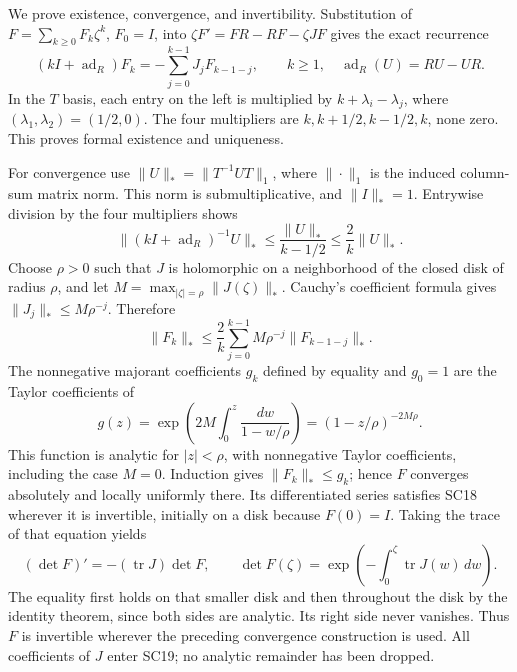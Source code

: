 \documentclass[11pt,a4paper]{article}
\theoremstyle{definition}\newtheorem{definition}[theorem]{Definition}
\begin{document}
We prove existence, convergence, and invertibility. Substitution
of \(F=\sum_{k\ge0}F_k\zeta^k\), \(F_0=I\), into
\(\zeta F'=FR-RF-\zeta JF\) gives the exact recurrence
\[
 (kI+\operatorname{ad}_R)F_k
   =-\sum_{j=0}^{k-1}J_jF_{k-1-j},\qquad k\ge1,
 \quad \operatorname{ad}_R(U)=RU-UR .
 \tag{SC19}
\]
In the \(T\) basis, each entry on the left is multiplied by
\(k+\lambda_i-\lambda_j\), where
\((\lambda_1,\lambda_2)=(1/2,0)\). The four multipliers are
\(k,k+1/2,k-1/2,k\), none zero. This proves formal existence
and uniqueness.

For convergence use
\(\|U\|_*=\|T^{-1}UT\|_1\), where \(\|\cdot\|_1\) is the
induced column-sum matrix norm. This norm is submultiplicative,
and \(\|I\|_*=1\). Entrywise division by the four multipliers
shows
\[
 \|(kI+\operatorname{ad}_R)^{-1}U\|_*
 \le\frac{\|U\|_*}{k-1/2}\le\frac2k\|U\|_*.
 \tag{SC20}
\]
Choose \(\rho>0\) such that \(J\) is holomorphic on a neighborhood
of the closed disk of radius \(\rho\), and let
\(M=\max_{|\zeta|=\rho}\|J(\zeta)\|_*\).
Cauchy's coefficient formula gives
\(\|J_j\|_*\le M\rho^{-j}\). Therefore
\[
 \|F_k\|_*\le\frac2k\sum_{j=0}^{k-1}
 M\rho^{-j}\|F_{k-1-j}\|_*.
\]
The nonnegative majorant coefficients \(g_k\) defined by equality
and \(g_0=1\) are the Taylor coefficients of
\[
 g(z)=\exp\!\left(2M\int_0^z\frac{dw}{1-w/\rho}\right)
     =(1-z/\rho)^{-2M\rho}.
 \tag{SC21}
\]
This function is analytic for \(|z|<\rho\), with nonnegative
Taylor coefficients, including the case \(M=0\).
Induction gives \(\|F_k\|_*\le g_k\); hence \(F\) converges
absolutely and locally uniformly there. Its differentiated
series satisfies SC18 wherever it is invertible, initially on
a disk because \(F(0)=I\). Taking the trace of that equation yields
\[
 (\det F)'=-(\operatorname{tr}J)\det F,\qquad
 \det F(\zeta)=
 \exp\!\left(-\int_0^\zeta\operatorname{tr}J(w)\,dw\right).
 \tag{SC22}
\]
The equality first holds on that smaller disk and then throughout
the disk by the identity theorem, since both sides are analytic.
Its right side never vanishes. Thus \(F\) is invertible wherever
the preceding convergence construction is used. All coefficients
of \(J\) enter SC19; no analytic remainder has been dropped.
\end{document}
